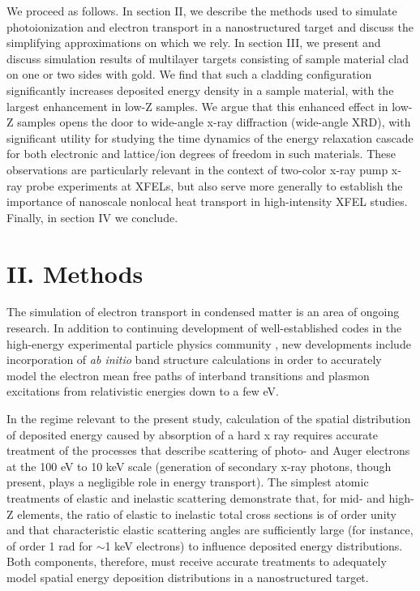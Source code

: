 We proceed as follows. In section II, we describe the methods used to
simulate photoionization and electron transport in a nanostructured
target and discuss the simplifying approximations on which we rely. In
section III, we present and discuss simulation results of multilayer
targets consisting of sample material clad on one or two sides with
gold. We find that such a cladding configuration significantly increases
deposited energy density in a sample material, with the largest
enhancement in low-Z samples. We argue that this enhanced effect in
low-Z samples opens the door to wide-angle x-ray diffraction (wide-angle
XRD), with significant utility for studying the time dynamics of the
energy relaxation cascade for both electronic and lattice/ion degrees of
freedom in such materials. These observations are particularly relevant
in the context of two-color x-ray pump x-ray probe experiments at
XFELs\cite{hoidn2017nonlocal, inoue2016observation, ho2015resonance, allaria2013two}, but also serve more generally to establish the
importance of nanoscale nonlocal heat transport in high-intensity XFEL
studies. Finally, in section IV we conclude.

\section{II. Methods}

The simulation of electron transport in condensed matter is an area of
ongoing research. In addition to continuing development of
well-established codes in the high-energy experimental particle physics
community \cite{agostinelli2003geant4}, new developments include incorporation of
\emph{ab initio} band structure calculations in order to accurately
model the electron mean free paths of interband transitions and plasmon
excitations from relativistic energies down to a few eV. \cite{gao2013monte, prange2014radiation}

In the regime relevant to the present study, calculation of the spatial
distribution of deposited energy caused by absorption of a hard x ray
requires accurate treatment of the processes that describe scattering of
photo- and Auger electrons at the 100 eV to 10 keV scale (generation of
secondary x-ray photons, though present, plays a negligible role in
energy transport). The simplest atomic treatments of elastic and
inelastic scattering demonstrate that, for mid- and high-Z elements, the
ratio of elastic to inelastic total cross sections is of order unity and
that characteristic elastic scattering angles are sufficiently large
(for instance, of order 1 rad for $\sim$1 keV electrons) to
influence deposited energy distributions. \cite{pollock2017accuracy} Both components,
therefore, must receive accurate treatments to adequately model spatial
energy deposition distributions in a nanostructured target.


